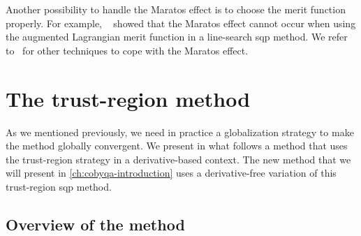 Another possibility to handle the Maratos effect is to choose the merit function properly.
For example, \citeauthor{Powell_Yuan_1986}~\cite[\S~4]{Powell_Yuan_1986} showed that the Maratos effect cannot occur when using the augmented Lagrangian merit function in a line-search \gls{sqp} method.
We refer to~\cite[\S~7]{Schittkowski_Yuan_2011} for other techniques to cope with the Maratos effect.

\section{The trust-region  method}
\label{sec:sqp-trust-region}

As we mentioned previously, we need in practice a globalization strategy to make the method globally convergent.
We present in what follows a method that uses the trust-region strategy in a derivative-based context.
The new method that we will present in \cref{ch:cobyqa-introduction} uses a derivative-free variation of this trust-region \gls{sqp} method.

\subsection{Overview of the method}

